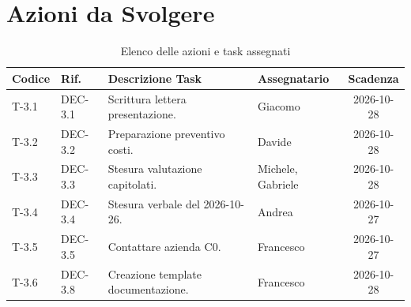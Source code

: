 \documentclass[11pt, a4paper]{article}
\begin{document}
\section{Azioni da Svolgere}

\begin{table}[htbp]
\centering
\caption{Elenco delle azioni e task assegnati}
\label{tab:azioni}
\begin{tabularx}{\textwidth}{l l X l c}
\toprule
\textbf{Codice} & \textbf{Rif.} & \textbf{Descrizione Task} & \textbf{Assegnatario} & \textbf{Scadenza} \\
\midrule
T-3.1 & DEC-3.1 & Scrittura lettera presentazione. & Giacomo & 2026-10-28 \\
T-3.2 & DEC-3.2 & Preparazione preventivo costi. & Davide   & 2026-10-28 \\
T-3.3 & DEC-3.3 & Stesura valutazione capitolati. & Michele, Gabriele    & 2026-10-28 \\
T-3.4 & DEC-3.4 & Stesura verbale del 2026-10-26. & Andrea & 2026-10-27 \\
T-3.5 & DEC-3.5 & Contattare azienda C0. & Francesco & 2026-10-27 \\
T-3.6 & DEC-3.8 & Creazione template documentazione. & Francesco & 2026-10-28 \\
\bottomrule
\end{tabularx}
\end{table}
\end{document}
